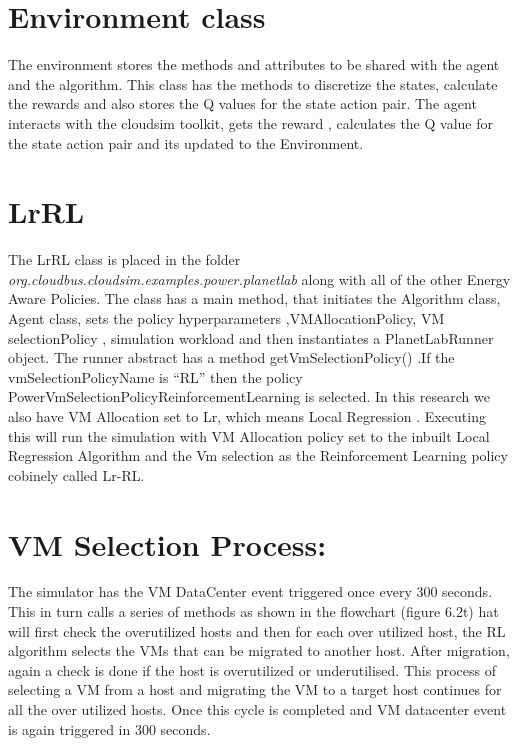 \documentclass[a4paper,12pt]{Classes/RoboticsLaTeX}
\begin{document}
       \section{Environment class}
       The environment stores the methods and attributes to be shared with the agent and the algorithm. This class has the methods to discretize the states, calculate the rewards and also stores the Q values for the state action pair. The agent interacts with the cloudsim toolkit, gets the reward , calculates the Q value for the state action pair and its updated to the Environment.

       \section{LrRL}
       The LrRL class is placed in the folder \textit{org.cloudbus.cloudsim.examples.power.planetlab}  along with all of the other Energy Aware Policies. The class has a main method, that initiates the Algorithm class, Agent class, sets the policy hyperparameters ,VMAllocationPolicy, VM selectionPolicy , simulation workload and then instantiates a PlanetLabRunner object. The runner abstract has a method getVmSelectionPolicy() .If the vmSelectionPolicyName is “RL” then the policy PowerVmSelectionPolicyReinforcementLearning is selected. In this research we also have VM Allocation set to Lr, which means Local Regression . Executing  this will run the simulation with VM Allocation policy set to the inbuilt Local Regression Algorithm and the Vm selection as the Reinforcement Learning policy cobinely called Lr-RL.\cite{Lukethesis}

       \section{VM Selection Process:}
       The simulator has the VM DataCenter event triggered once every 300 seconds. This in turn calls a series of methods as shown in the flowchart (figure 6.2t) hat will first check the overutilized hosts and then for each over utilized host, the RL algorithm selects the VMs that can be migrated to another host. After migration, again a check is done if the host is overutilized or underutilised. This process of selecting a VM from a host and migrating the VM to a target host continues for all the over utilized hosts. Once this cycle is completed and VM datacenter event is again triggered in 300 seconds.
\end{document}
